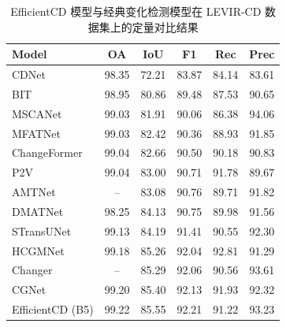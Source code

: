 \begin{table}[!htb]
  \centering
  \caption{EfficientCD 模型与经典变化检测模型在 LEVIR-CD 数据集上的定量对比结果}
  \label{tab:efficientcd_levir}
  \begin{tabular}{lccccc}
    \toprule
    Model            &   OA   &  IoU   &   F1   &  Rec   &  Prec   \\
    \midrule
    CDNet~\cite{Alcantarilla2016StreetviewCD}            &  98.35 &  72.21 &  83.87 &  84.14 &  83.61  \\
    BIT~\cite{chen_remote_2022}              &  98.95 &  80.86 &  89.48 &  87.53 &  90.65  \\
    MSCANet~\cite{m_liu_cnn-transformer_2022}          &  99.03 &  81.91 &  90.06 &  86.38 &  94.06  \\
    MFATNet~\cite{Mao2022MFATNetMF}          &  99.03 &  82.42 &  90.36 &  88.93 &  91.85  \\
    ChangeFormer~\cite{bandara2022transformer}     &  99.04 &  82.66 &  90.50 &  90.18 &  90.83  \\
    P2V~\cite{lin_transition_2023}              &  99.04 &  83.00 &  90.71 &  91.78 &  89.67  \\
    AMTNet~\cite{Liu2023AnAM}           &   --   &  83.08 &  90.76 &  89.71 &  91.82  \\
    DMATNet~\cite{Song2022RemoteSI}          &  98.25 &  84.13 &  90.75 &  89.98 &  91.56  \\
    STransUNet~\cite{Yuan2022STransUNetAS}       &  99.13 &  84.19 &  91.41 &  90.55 &  92.30  \\
    HCGMNet~\cite{Han2023HCGMNetAH}          &  99.18 &  85.26 &  92.04 &  92.81 &  91.29  \\
    Changer~\cite{Fang2022ChangerFI}        &   --   &  85.29 &  92.06 &  90.56 &  93.61  \\
    CGNet~\cite{han_change_2023}            &  99.20 &  85.40 &  92.13 &  91.93 &  92.32  \\
    EfficientCD (B5) &  99.22 &  85.55 &  92.21 &  91.22 &  93.23  \\
    \bottomrule
  \end{tabular}
\end{table}



